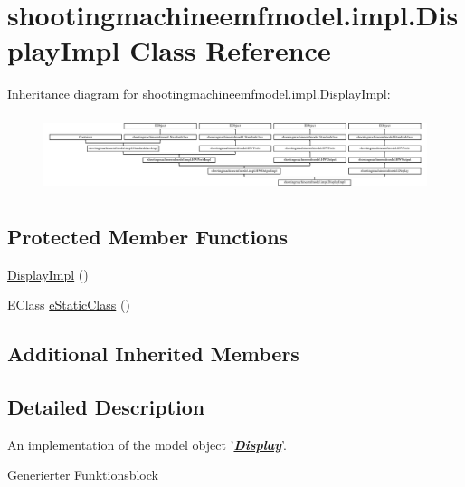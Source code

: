 \hypertarget{classshootingmachineemfmodel_1_1impl_1_1_display_impl}{\section{shootingmachineemfmodel.\-impl.\-Display\-Impl Class Reference}
\label{classshootingmachineemfmodel_1_1impl_1_1_display_impl}
}
Inheritance diagram for shootingmachineemfmodel.\-impl.\-Display\-Impl\-:\begin{figure}[H]
\begin{center}
\leavevmode
\includegraphics[height=2.247492cm]{classshootingmachineemfmodel_1_1impl_1_1_display_impl}
\end{center}
\end{figure}
\subsection*{Protected Member Functions}
\begin{DoxyCompactItemize}
\item 
\hyperlink{classshootingmachineemfmodel_1_1impl_1_1_display_impl_a9ca34a3e9107a845792748673182c62a}{Display\-Impl} ()
\item 
E\-Class \hyperlink{classshootingmachineemfmodel_1_1impl_1_1_display_impl_a6bf8f93ce54e77bb47501a876503a040}{e\-Static\-Class} ()
\end{DoxyCompactItemize}
\subsection*{Additional Inherited Members}


\subsection{Detailed Description}
An implementation of the model object '{\itshape {\bfseries \hyperlink{interfaceshootingmachineemfmodel_1_1_display}{Display}}}'.

Generierter Funktionsblock 

